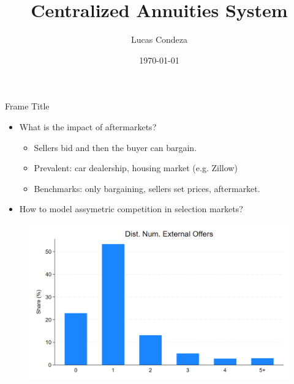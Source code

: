 \documentclass[10pt,aspectratio=169]{beamer}
\title{Centralized Annuities System}
\author{%
 Lucas Condeza
\inst{1} \and
}
\institute{
  \inst{1} Yale University \\
}
\date{\today}
\begin{document}
\begin{frame}
  \titlepage
\end{frame}


\begin{frame}{Frame Title}
    
\begin{itemize}
    
    \item What is the impact of aftermarkets? 

    \begin{itemize}
        \item Sellers bid and then the buyer can bargain. 
        \item Prevalent: car dealership, housing market (e.g. Zillow) 

        \item Benchmarks: only bargaining, sellers set prices, aftermarket. 
    \end{itemize}

    \item How to model assymetric competition in selection markets? 
\end{itemize}
\end{frame}




\begin{frame}{}
\begin{figure}[H]
\caption{}
\label{fig:ie3_0}
\centering{}%
\includegraphics[scale=0.27]{../figures/IE3_dist_external_offers.png}
\end{figure}
\end{frame}
\end{document}
